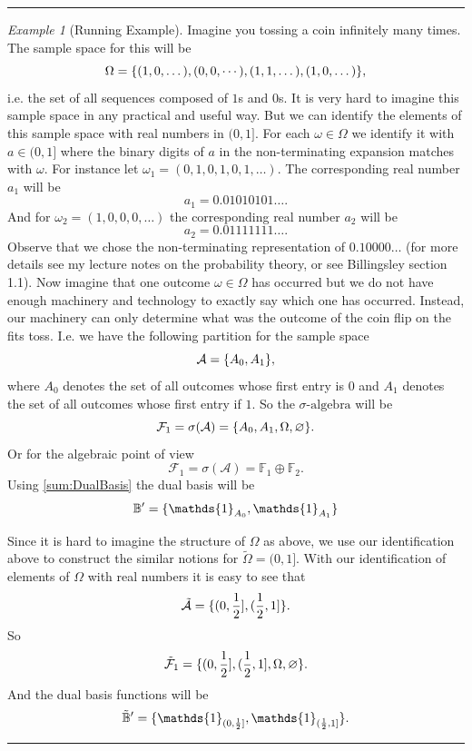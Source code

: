 \documentclass[11pt,a4paper]{article}
\theoremstyle{definition}
\theoremstyle{remark}
\newtheorem{example}{Example}
\begin{document}
	\vspace{5pt}
	\hrule
	\begin{example}[Running Example]
		Imagine you tossing a coin infinitely many times. The sample space for this will be
		\[ \Omega = \{(1,0,\dots),(0,0,\cdots),(1,1,\dots),(1,0,\dots)\}, \]
		i.e. the set of all sequences composed of $ 1 $s and $ 0 $s. It is very hard to imagine this sample space in any practical and useful way. But we can identify the elements of this sample space with real numbers in $ (0,1] $. For each $ \omega \in \Omega $ we identify it with $ a \in (0,1] $ where the binary digits of $ a $ in the non-terminating expansion matches with $ \omega $. For instance let $ \omega_1 = (0,1,0,1,0,1,\dots) $. The corresponding real number $ a_1 $ will be
		\[ a_1 = 0.01010101\dots. \]
		And for $ \omega_2 = (1,0,0,0,\dots) $ the corresponding real number $ a_2 $ will be
		\[ a_2 = 0.01111111\dots. \]
		Observe that we chose the non-terminating representation of $ 0.10000\dots $ (for more details see my lecture notes on the probability theory, or see Billingsley section 1.1). Now imagine that one outcome $ \omega \in \Omega $ has occurred but we do not have enough machinery and technology to exactly say which one has occurred. Instead, our machinery can only determine what was the outcome of the coin flip on the fits toss. I.e. we have the following partition for the sample space
		\[ \mathcal{A} = \{A_{0},A_{1}\}, \]
		where $ A_{0} $ denotes the set of all outcomes whose first entry is 0 and $ A_1 $ denotes the set of all outcomes whose first entry if $ 1 $. So the $\sigma\text{-algebra}$ will be
		\[ \mathcal{F}_1 = \sigma(\mathcal{A}) = \{A_0,A_1,\Omega,\varnothing\}. \]
		Or for the algebraic point of view
		\[ \mathcal{F}_1 = \sigma(\mathcal{A}) = \mathbb{F}_1 \oplus \mathbb{F}_2. \]
		Using \autoref{sum:DualBasis} the dual basis will be
		\[ \mathbb{B}' = \set{\mathds{1}_{A_0},\mathds{1}_{A_1}} \]
		
		Since it is hard to imagine the structure of $ \Omega $ as above, we use our identification above to construct the similar notions for $ \tilde\Omega = (0,1] $.
		With our identification of elements of $ \Omega $ with real numbers it is easy to see that
		\[ \tilde{\mathcal{A}} = \{(0,\frac{1}{2}],(\frac{1}{2},1]\}. \]
		So 
		\[ \tilde{\mathcal{F}}_1 = \{(0,\frac{1}{2}],(\frac{1}{2},1],\Omega, \varnothing\}. \]
		And the dual basis functions will be
		\[ \tilde{\mathbb{B}}' = \set{\mathds{1}_{(0,\frac{1}{2}]},\mathds{1}_{(\frac{1}{2},1]}}. \]
	\end{example}
	\hrule
	\vspace{5pt}
	
\end{document}
